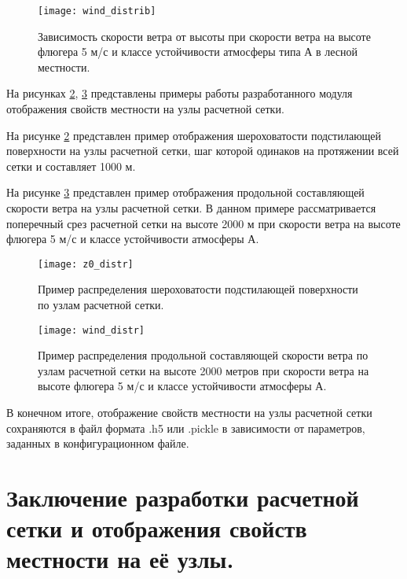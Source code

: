 \begin{figure}[ht]
    \centering
    \texttt{[image: wind\_distrib]}
    \captionsetup{justification=centering}
    \caption{Зависимость скорости ветра от высоты при скорости ветра на высоте флюгера 5 м/с и классе устойчивости 
        атмосферы типа А в лесной местности.}
    \label{fig_wind_distrib}
\end{figure}

На рисунках \ref{fig_z0_distrib}, \ref{fig_wind_distrib} представлены примеры работы разработанного модуля отображения 
свойств местности на узлы расчетной сетки. 

На рисунке \ref{fig_z0_distrib} представлен пример отображения шероховатости подстилающей поверхности на узлы расчетной 
сетки, шаг которой одинаков на протяжении всей сетки и составляет 1000 м.

На рисунке \ref{fig_wind_distrib} представлен пример отображения продольной составляющей скорости ветра на узлы 
расчетной сетки. В данном примере рассматривается поперечный срез расчетной сетки на высоте 2000 м при скорости ветра 
на высоте флюгера 5 м/с и классе устойчивости атмосферы А.

\begin{figure}[ht]
    \centering
    \texttt{[image: z0\_distr]}
    \captionsetup{justification=centering}
    \caption{Пример распределения шероховатости подстилающей поверхности по узлам расчетной сетки.}
    \label{fig_z0_distrib}
\end{figure}

\begin{figure}[ht]
    \centering
    \texttt{[image: wind\_distr]}
    \captionsetup{justification=centering}
    \caption{Пример распределения продольной составляющей скорости ветра по узлам расчетной сетки на высоте 2000 метров 
        при скорости ветра на высоте флюгера 5 м/с и классе устойчивости атмосферы А.}
    \label{fig_wind_distrib}
\end{figure}

В конечном итоге, отображение свойств местности на узлы расчетной сетки сохраняются в файл формата .h5 или .pickle в 
зависимости от параметров, заданных в конфигурационном файле. 

\section{Заключение разработки расчетной сетки и отображения свойств местности на её узлы.}


